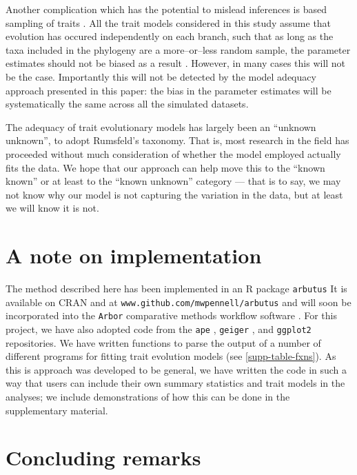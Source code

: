 \documentclass[12pt]{article}
\begin{document}
Another complication which has the potential to mislead inferences is based sampling of traits \citep{Freckletoninaction, longeuroname, FitzJohnwoody}. All the trait models considered in this study assume that evolution has occured independently on each branch, such that as long as the taxa included in the phylogeny are a more--or--less random sample, the parameter estimates should not be biased as a result \citep{PennellHarmon}. However, in many cases \citep[especially when using large trait databases][]{FitzJohnwoody} this will not be the case. Importantly this will not be detected by the model adequacy approach presented in this paper: the bias in the parameter estimates will be systematically the same across all the simulated datasets.


The adequacy of trait evolutionary models has largely been an ``unknown unknown'', to adopt Rumsfeld's taxonomy. That is, most research in the field has proceeded without much consideration of whether the model employed actually fits the data. We hope that our approach can help move this to the ``known known'' or at least to the ``known unknown'' category --- that is to say, we may not know why our model is not capturing the variation in the data, but at least we will know it is not.


\section*{A note on implementation}

The method described here has been implemented in an R package \texttt{arbutus} It is available on CRAN and at \texttt{www.github.com/mwpennell/arbutus} and will soon be incorporated into the \texttt{Arbor} comparative methods workflow software \citep{Arbor}. For this project, we have also adopted code from the \texttt{ape} \citep{ape}, \texttt{geiger} \citep{geiger}, and \texttt{ggplot2} \citep{ggplot2} repositories. We have written functions to parse the output of a number of different programs for fitting trait evolution models (see \ref{supp-table-fxns}). As this is approach was developed to be general, we have written the code in such a way that users can include their own summary statistics and trait models in the analyses; we include demonstrations of how this can be done in the supplementary material.

\section*{Concluding remarks}
\end{document}
